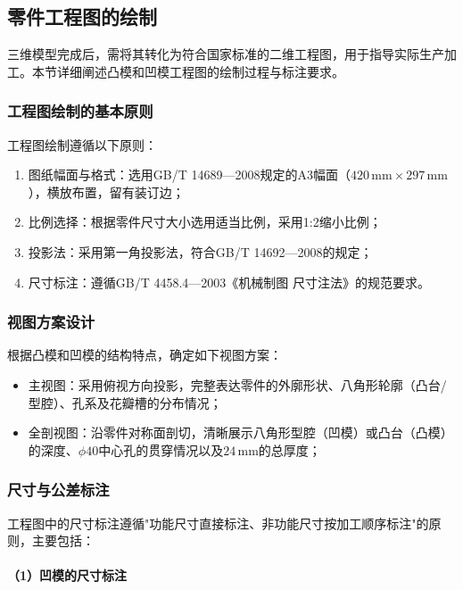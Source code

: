 \documentclass{xautCADreport}
\begin{document}
\subsection{零件工程图的绘制}

三维模型完成后，需将其转化为符合国家标准的二维工程图，用于指导实际生产加工。本节详细阐述凸模和凹模工程图的绘制过程与标注要求。

\subsubsection{工程图绘制的基本原则}

工程图绘制遵循以下原则：
\begin{enumerate}
  \item 图纸幅面与格式：选用GB/T 14689—2008规定的A3幅面（$420\,\mathrm{mm}\times297\,\mathrm{mm}$），横放布置，留有装订边；
  \item 比例选择：根据零件尺寸大小选用适当比例，采用1:2缩小比例；
  \item 投影法：采用第一角投影法，符合GB/T 14692—2008的规定；
  \item 尺寸标注：遵循GB/T 4458.4—2003《机械制图 尺寸注法》的规范要求。
\end{enumerate}

\subsubsection{视图方案设计}

根据凸模和凹模的结构特点，确定如下视图方案：

\begin{itemize}
  \item 主视图：采用俯视方向投影，完整表达零件的外廓形状、八角形轮廓（凸台/型腔）、孔系及花瓣槽的分布情况；
  \item 全剖视图：沿零件对称面剖切，清晰展示八角形型腔（凹模）或凸台（凸模）的深度、$\phi40$中心孔的贯穿情况以及$24\,\mathrm{mm}$的总厚度；
\end{itemize}

\subsubsection{尺寸与公差标注}

工程图中的尺寸标注遵循"功能尺寸直接标注、非功能尺寸按加工顺序标注"的原则，主要包括：

\paragraph{（1）凹模的尺寸标注}
\end{document}
